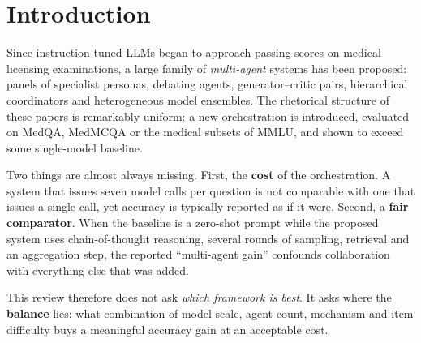\documentclass[11pt,a4paper]{article}
\begin{document}
\begin{abstract}
\noindent\textbf{Conclusions.} There is \emph{no reproducible accuracy advantage} for medical
multi-agent systems once the comparator is the strongest single agent the same paper already
ran; the direction is robust across every sensitivity analysis but the magnitude is not.
Reporting of cost is so incomplete that cost had to be derived from architecture in most
comparisons. We recommend that future work report a same-backbone strongest baseline, an
equal-budget self-consistency control arm, and per-question cost as a matter of course.

\noindent\textbf{Registration.} Protocol in \texttt{design/plan.md}; \emph{not}
prospectively registered (see \S\ref{sec:limproc}).
\end{abstract}

\section{Introduction}

Since instruction-tuned LLMs began to approach passing scores on medical licensing
examinations, a large family of \emph{multi-agent} systems has been proposed: panels of
specialist personas, debating agents, generator--critic pairs, hierarchical coordinators and
heterogeneous model ensembles. The rhetorical structure of these papers is remarkably
uniform: a new orchestration is introduced, evaluated on MedQA, MedMCQA or the medical
subsets of MMLU, and shown to exceed some single-model baseline.

Two things are almost always missing. First, the \textbf{cost} of the orchestration.
A system that issues seven model calls per question is not comparable with one that issues
a single call, yet accuracy is typically reported as if it were. Second, a \textbf{fair
comparator}. When the baseline is a zero-shot prompt while the proposed system uses
chain-of-thought reasoning, several rounds of sampling, retrieval and an aggregation step,
the reported ``multi-agent gain'' confounds collaboration with everything else that was
added.

This review therefore does not ask \emph{which framework is best}. It asks where the
\textbf{balance} lies: what combination of model scale, agent count, mechanism and item
difficulty buys a meaningful accuracy gain at an acceptable cost.
\end{document}
